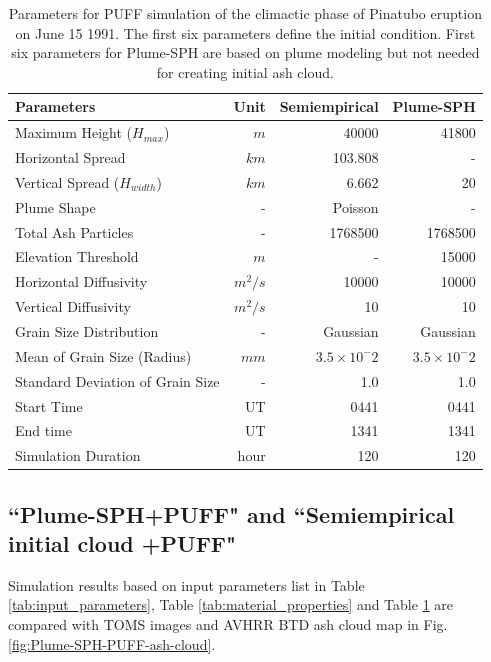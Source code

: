\begin{table}[htp]
\centering
      \caption{Parameters for PUFF simulation of the climactic phase of Pinatubo eruption on June 15 1991. The first six parameters define the initial condition. First six parameters for Plume-SPH are based on plume modeling but not needed for creating initial ash cloud. }
	  \begin{tabular}{lrrr}
	    \hline
	    Parameters    & Unit & Semiempirical & Plume-SPH \\
	    \hline
	    Maximum Height ($H_{max}$) & $m$ & 40000 & 41800 \\
	    Horizontal Spread & $km$ & 103.808 & -\\
	    Vertical Spread ($H_{width}$) & $km$ & 6.662  & 20 \\
	    Plume Shape & - & Poisson & - \\
	    Total Ash Particles  & - & 1768500 & 1768500 \\
	    Elevation Threshold & $m$ & - &  15000 \\
	    Horizontal Diffusivity & $m^2/s$ &10000 & 10000\\
	    Vertical Diffusivity & $m^2/s$ & 10 & 10 \\
	    Grain Size Distribution & - & Gaussian & Gaussian  \\
	    Mean of Grain Size (Radius) & $mm$ & $3.5 \times 10 ^-2$ & $3.5 \times 10 ^-2$ \\
	    Standard Deviation of Grain Size & - &  1.0 & 1.0 \\
	    	Start Time & UT & 0441 & 0441 \\
	    End time & UT & 1341 & 1341 \\
	    Simulation Duration & hour & 120 & 120 \\
	    \hline
	  \end{tabular}
	  \label{tab:input_parameter_PUFF_simulation}
\end{table}

\subsection{``Plume-SPH+PUFF" and ``Semiempirical initial cloud +PUFF"}

Simulation results based on input parameters list in Table \ref{tab:input_parameters}, Table \ref{tab:material_properties} and Table \ref{tab:input_parameter_PUFF_simulation} are compared with TOMS images and AVHRR BTD ash cloud map in Fig. \ref{fig:Plume-SPH-PUFF-ash-cloud}.

